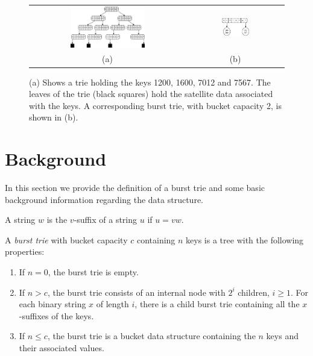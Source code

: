 \documentclass[]{acmtrans2m}
\begin{document}
\begin{figure}[t]
\center
\begin{tabular}{cc}
\includegraphics[width=0.5\textwidth]{figs/simple_trie.eps} & \includegraphics[width=0.3\textwidth]{figs/trie1.eps}\\
(a) & (b)\\
\end{tabular}
\caption{(a) Shows a trie holding the keys 1200, 1600, 7012
and 7567. The leaves of the trie (black squares) hold the satellite
data associated with the keys. A corresponding burst trie, with bucket capacity 2, is shown in (b).}
\label{simple_trie}
\end{figure}

\section{Background}
\label{background}

In this section we provide the definition of a burst trie and some
basic background information regarding the data structure.

\begin{definition}
A string $w$ is the $v$-suffix of a string $u$ if $u = vw$.
\end{definition}

\begin{definition}
A \textit{burst trie} with bucket capacity $c$ containing $n$ keys is a tree with the following properties:
\begin{enumerate}
    \item If $n = 0$, the burst trie is empty.
    \item If $n > c$, the burst trie consists of an internal node with $2^i$ children, $i \geq 1$. 
          For each binary string $x$ of length $i$, there is a child burst trie containing all the $x$-suffixes of
          the keys.
    \item If $n \leq c$, the burst trie is a bucket data structure containing the $n$ keys and their associated values.
\end{enumerate}
\end{definition}
\end{document}
